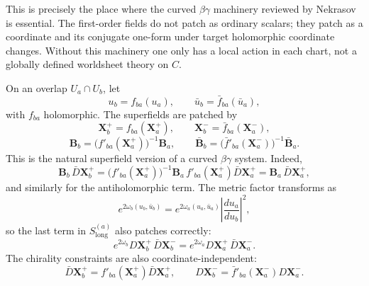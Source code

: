 \documentclass[11pt]{article}
\begin{document}
This is precisely the place where the curved $\beta\gamma$ machinery reviewed by Nekrasov \cite{nekrasov2005curvedbetagammasystems} is essential. The first-order fields do not patch as ordinary scalars; they patch as a coordinate and its conjugate one-form under target holomorphic coordinate changes. Without this machinery one only has a local action in each chart, not a globally defined worldsheet theory on $C$.

On an overlap $U_a\cap U_b$, let
\begin{equation}\label{eq:target-transition-functions}
u_b=f_{ba}(u_a),
\qquad
\bar u_b=\bar f_{ba}(\bar u_a),
\end{equation}
with $f_{ba}$ holomorphic. The superfields are patched by
\begin{equation}\label{eq:superfield-patching}
\mathbf X^+_b=f_{ba}(\mathbf X^+_a),
\qquad
\mathbf X^-_b=\bar f_{ba}(\mathbf X^-_a),
\end{equation}
\begin{equation}\label{eq:beta-patching}
\mathbf B_b=\big(f'_{ba}(\mathbf X^+_a)\big)^{-1}\mathbf B_a,
\qquad
\bar{\mathbf B}_b=\big(\bar f'_{ba}(\mathbf X^-_a)\big)^{-1}\bar{\mathbf B}_a.
\end{equation}
This is the natural superfield version of a curved $\beta\gamma$ system. Indeed,
\begin{equation}\label{eq:bf-patching-check}
\mathbf B_b\,\bar D\mathbf X^+_b
=
\big(f'_{ba}(\mathbf X^+_a)\big)^{-1}\mathbf B_a\,
f'_{ba}(\mathbf X^+_a)\bar D\mathbf X^+_a
=
\mathbf B_a\,\bar D\mathbf X^+_a,
\end{equation}
and similarly for the antiholomorphic term. The metric factor transforms as
\begin{equation}\label{eq:metric-transformation}
e^{2\omega_b(u_b,\bar u_b)}
=
e^{2\omega_a(u_a,\bar u_a)}
\left|\frac{du_a}{du_b}\right|^2,
\end{equation}
so the last term in $S^{(a)}_{\mathrm{long}}$ also patches correctly:
\begin{equation}\label{eq:kinetic-patching-check}
e^{2\omega_b}D\mathbf X^+_b\,\bar D\mathbf X^-_b
=
e^{2\omega_a}D\mathbf X^+_a\,\bar D\mathbf X^-_a.
\end{equation}
The chirality constraints are also coordinate-independent:
\begin{equation}\label{eq:chirality-patching}
\bar D\mathbf X^+_b=f'_{ba}(\mathbf X^+_a)\bar D\mathbf X^+_a,
\qquad
D\mathbf X^-_b=\bar f'_{ba}(\mathbf X^-_a)D\mathbf X^-_a.
\end{equation}
\end{document}
